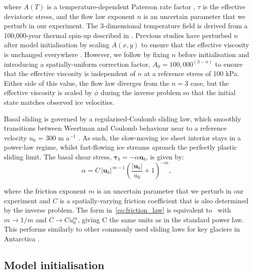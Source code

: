 \documentclass[journal abbreviation, manuscript]{copernicus}
\begin{document}
\noindent where $A(T)$ is a temperature-dependent Paterson rate factor \citep{cuffeyPhysicsGlaciers2010}, $\tau$ is the effective deviatoric stress, and the flow law exponent $n$ is an uncertain parameter that we perturb in our experiment. The 3-dimensional temperature field is derived from a 100,000-year thermal spin-up described in \citet{treversRetreatThwaitesGlacier2024}. Previous studies have perturbed $n$ after model initialisation by scaling $A(x, y)$ to ensure that the effective viscosity is unchanged everywhere \citep{getraerIncreasingGlenNye2025,rosierCalibratedSeaLevel2025}. However, we follow \citep{martinRatesSeaLevelRise2026} by fixing $n$ before initialisation and introducing a spatially-uniform correction factor, $A_0 = 100,000^{(3-n)}$ to ensure that the effective viscosity is independent of $n$ at a reference stress of 100 kPa. Either side of this value, the flow law diverges from the $n=3$ case, but the effective viscosity is scaled by $\phi$ during the inverse problem so that the initial state matches observed ice velocities.

Basal sliding is governed by a regularised-Coulomb sliding law, which smoothly transitions between Weertman and Coulomb behaviour near to a reference velocity $u_0$ = 300 m a$^{-1}$ \citep{joughinRegularizedCoulombFriction2019}. As such, the slow-moving ice sheet interior stays in a power-law regime, whilst fast-flowing ice streams aproach the perfectly plastic sliding limit. The basal shear stress, $\bm{\tau}_b = -\alpha \mathbf{u}_b$, is given by:
\begin{equation}\label{eq:friction_law}
    \alpha = C \, \lvert \mathbf{u}_b \rvert^{\,m-1}
         \left( \frac{\lvert \mathbf{u}_b \rvert}{u_0} + 1 \right)^{-m},
\end{equation}

\noindent where the friction exponent $m$ is an uncertain parameter that we perturb in our experiment and $C$ is a spatially-varying friction coefficient that is also determined by the inverse problem. The form in~\eqref{eq:friction_law} is equivalent to~\cite{joughinRegularizedCoulombFriction2019} with $m \rightarrow 1/m$ and $C \rightarrow Cu_0^m$, giving C the same units as in the standard power law. This performs similarly to other commonly used sliding laws for key glaciers in Antarctica \citep{barnesPredictivePowerIce2022}.

\subsection{Model initialisation}
\end{document}
